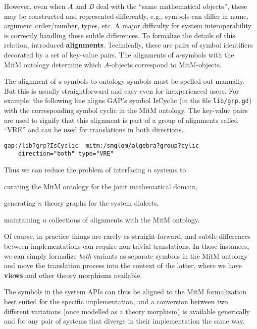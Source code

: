 However, even when $A$ and $B$ deal with the ``same mathematical objects'', these may be constructed and represented differently, e.g., symbols can differ in name,
argument order/number, types, etc.
A major difficulty for system interoperability is correctly handling these subtle differences.
To formalize the details of this relation, \cite{MueGauKal:cacfms17} introduced \OMMT \textbf{alignments}.
Technically, these are pairs of \OMMT symbol identifiers decorated by a set of key-value pairs.
The alignments of $a$-symbols with the MitM ontology determine which $A$-objects correspond to MitM-objects.

The alignment of $a$-symbols to ontology symbols must be spelled out manually.
But this is usually straightforward and easy even for inexperienced users. For example, the following line aligns GAP's symbol \textsf{IsCyclic} (in the file \lstinline|lib/grp.gd|) with the corresponding symbol \textsf{cyclic} in the MitM ontology.
The key-value pairs are used to signify that this alignment is part of a group of alignments called ``VRE'' and can be used for translations in both directions.

\begin{lstlisting}
gap:/lib?grp?IsCyclic  mitm:/smglom/algebra?group?cylic
    direction="both" type="VRE"
\end{lstlisting}

Thus we can reduce the problem of interfacing $n$ systems to
\begin{inparaenum}[\em i\rm)]
\item curating the MitM ontology for the joint mathematical domain,
\item generating $n$ theory graphs for the system dialects,
\item maintaining $n$ collections of alignments with the MitM ontology.
\end{inparaenum}\medskip

Of course, in practice things are rarely as straight-forward, and subtle differences between implementations can require non-trivial translations. In those instances, we can simply formalize \emph{both} variants as separate symbols in the MitM ontology and move the translation process into the context of the latter, where we have \MMT \textbf{views} and other theory morphisms available.

The symbols in the system APIs can thus be aligned to the MitM formalization best suited for the specific implementation, and a conversion between two different variations (once modelled as a theory morphism) is available generically and for any pair of systems that diverge in their implementation the same way.
\medskip


